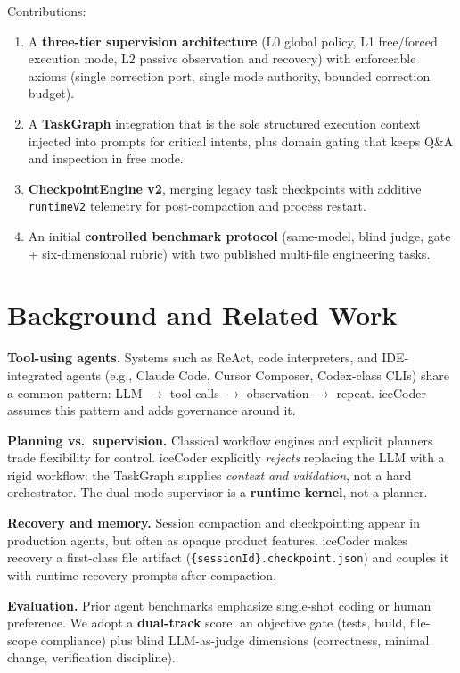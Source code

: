 \documentclass[11pt,a4paper]{article}
\begin{document}
Contributions:
\begin{enumerate}[nosep]
  \item A \textbf{three-tier supervision architecture} (L0 global policy, L1 free/forced execution mode, L2 passive observation and recovery) with enforceable axioms (single correction port, single mode authority, bounded correction budget).
  \item A \textbf{TaskGraph} integration that is the sole structured execution context injected into prompts for critical intents, plus domain gating that keeps Q\&A and inspection in free mode.
  \item \textbf{CheckpointEngine v2}, merging legacy task checkpoints with additive \texttt{runtimeV2} telemetry for post-compaction and process restart.
  \item An initial \textbf{controlled benchmark protocol} (same-model, blind judge, gate + six-dimensional rubric) with two published multi-file engineering tasks.
\end{enumerate}

\section{Background and Related Work}
\label{sec:related}

\textbf{Tool-using agents.}
Systems such as ReAct, code interpreters, and IDE-integrated agents (e.g., Claude Code, Cursor Composer, Codex-class CLIs) share a common pattern: LLM $\rightarrow$ tool calls $\rightarrow$ observation $\rightarrow$ repeat.
iceCoder assumes this pattern and adds governance around it.

\textbf{Planning vs.\ supervision.}
Classical workflow engines and explicit planners trade flexibility for control.
iceCoder explicitly \emph{rejects} replacing the LLM with a rigid workflow; the TaskGraph supplies \emph{context and validation}, not a hard orchestrator.
The dual-mode supervisor is a \textbf{runtime kernel}, not a planner.

\textbf{Recovery and memory.}
Session compaction and checkpointing appear in production agents, but often as opaque product features.
iceCoder makes recovery a first-class file artifact (\texttt{\{sessionId\}.checkpoint.json}) and couples it with runtime recovery prompts after compaction.

\textbf{Evaluation.}
Prior agent benchmarks emphasize single-shot coding or human preference.
We adopt a \textbf{dual-track} score: an objective gate (tests, build, file-scope compliance) plus blind LLM-as-judge dimensions (correctness, minimal change, verification discipline).
\end{document}
